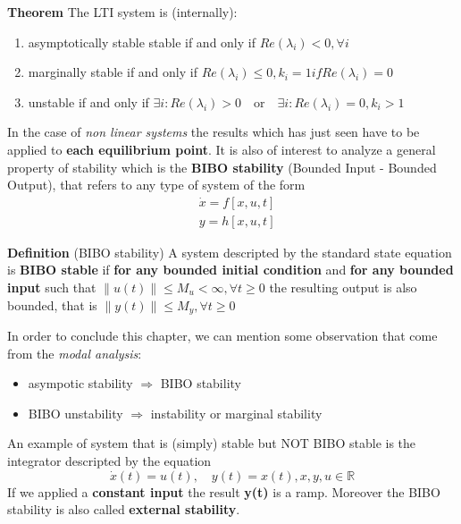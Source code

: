 \noindent
\textbf{Theorem} The LTI system is (internally):
\begin{enumerate}
    \item {\color{red} asymptotically stable} stable if and only if
    $Re(\lambda_i)<0, \forall i$
    \item{\color{red} marginally stable } if and only if $Re(\lambda_i)\le 0, k_i=1 if Re(\lambda_i)=0$
    \item {\color{red} unstable} if and only if
    $\exists i: Re(\lambda_i)>0 \quad \textrm{or} \quad \exists i: Re(\lambda_i)=0, k_i>1$
\end{enumerate}

\noindent
In the case of \textit{non linear systems} the results which has just seen have to be applied to \textbf{each equilibrium point}. It is also of interest to analyze a general property of stability which is the \textbf{BIBO stability} (Bounded Input - Bounded Output), that refers to any type of system of the form 
\begin{align*}
    &\dot{x}=f[x, u, t]\\
    &y=h[x, u, t]
\end{align*}

\noindent
\textbf{Definition} (BIBO stability) A system descripted by the standard state equation  is \textbf{BIBO stable} if \textbf{for any bounded initial condition} and \textbf{for any bounded input} such that $\lVert u(t) \rVert \le M_u < \infty, \forall t \ge 0$ the resulting output is also bounded, that is $\lVert y(t) \rVert \le M_y, \forall t\ge 0$

\noindent
In order to conclude this chapter, we can mention some observation that come from the \textit{modal analysis}: 
\begin{itemize}
    \item asympotic stability $\Longrightarrow$ BIBO stability
    \item BIBO unstability $\Longrightarrow$ instability or marginal stability
\end{itemize}
An example of system that is (simply) stable but NOT BIBO stable is the integrator descripted by the equation
$$\dot{x}(t)=u(t), \quad y(t)=x(t), x,y,u \in \mathbb{R}$$
If we applied a \textbf{constant input} the result \textbf{y(t)} is a ramp. Moreover the BIBO stability is also called \textbf{external stability}.




